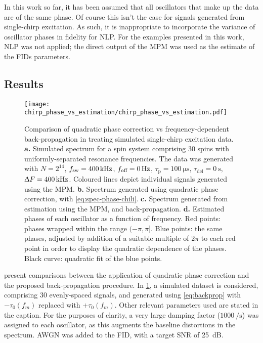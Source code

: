 In this work so far, it has been assumed that all oscillators that make up the
data are of the same phase. Of course this isn't the case for signals
generated from single-chirp excitation. As such, it is inappropriate to
incorporate the variance of oscillator phases in fidelity for \ac{NLP}.
For the examples presented in this work, \ac{NLP} was not applied; the direct
output of the \ac{MPM} was used as the estimate of the \acp{FID} parameters.

\subsection{Results}
\begin{figure}
    \centering
    \texttt{[image: chirp\_phase\_vs\_estimation/chirp\_phase\_vs\_estimation.pdf]}
    \caption[
        Comparison of quadratic phase correction vs frequency-dependent
        back-propagation in treating simulated single-chirp excitation data.
    ]
    {
        Comparison of quadratic phase correction vs frequency-dependent
        back-propagation in treating simulated single-chirp excitation data.
        \textbf{a.} Simulated spectrum for a spin system comprising 30 spins
        with uniformly-separated resonance frequencies. The data was generated
        with
        $N=2^{14}$,
        $f_{\mathrm{sw}}=\qty{400}{\kilo\hertz}$,
        $f_{\text{off}}=\qty{0}{\hertz}$,
        $\tau_{\text{p}} = \qty{100}{\micro\second}$,
        $\tau_{\text{del}} = \qty{0}{\second}$,
        $\Updelta F = \qty{400}{\kilo\hertz}$.
        Coloured lines depict individual signals generated using the \ac{MPM}.
        \textbf{b.} Spectrum generated using quadratic phase correction, with
        \cref{eq:spec-phase-chili}.
        \textbf{c.} Spectrum generated from estimation using the \ac{MPM}, and
        back-propagation.
        \textbf{d.} Estimated phases of each oscillator as a function of
        frequency. Red points: phases wrapped within the range $(-\pi, \pi]$.
        Blue points: the same phases, adjusted by addition of a suitable multiple
        of $2 \pi$ to each red point in order to display the quadratic
        dependence of the phases. Black curve: quadratic fit of the blue
        points.
    }
    \label{fig:bbqchili-sim}
\end{figure}
 present comparisons
between the application of quadratic phase correction and the proposed
back-propagation procedure. In \cref{fig:bbqchili-sim}, a simulated
dataset is considered, comprising 30 evenly-spaced signals, and generated using
\cref{eq:backprop} with $-\tau_0(f_m)$ replaced with $+\tau_0(f_m)$. Other
relevant parameters used are stated in the caption.
For the purposes of clarity, a very large damping factor
($\qty{1000}{\per\second}$) was assigned to each oscillator, as this augments
the baseline distortions in the spectrum. \ac{AWGN} was added to the \ac{FID},
with a target \ac{SNR} of \qty{25}{\deci\bel}.

